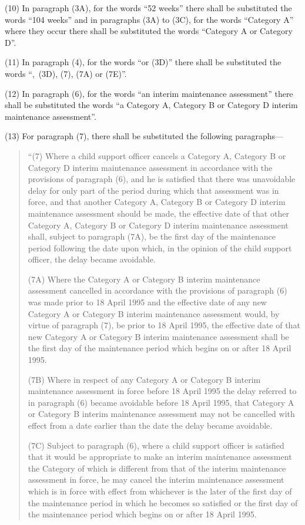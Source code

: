 \documentclass[a4paper]{article}
\begin{document}
(10) In paragraph (3A), for the words “52 weeks” there shall be substituted the words “104 weeks” and in paragraphs (3A) to (3C), for the words “Category A” where they occur there shall be substituted the words “Category A or Category D”.

(11) In paragraph (4), for the words “or (3D)” there shall be substituted the words “,~(3D), (7), (7A) or (7E)”.

(12) In paragraph (6), for the words “an interim maintenance assessment” there shall be substituted the words “a Category A, Category B or Category D interim maintenance assessment”.

(13) For paragraph (7), there shall be substituted the following paragraphs—
\begin{quotation}
“(7) Where a child support officer cancels a Category A, Category B or Category D interim maintenance assessment in accordance with the provisions of paragraph (6), and he is satisfied that there was unavoidable delay for only part of the period during which that assessment was in force, and that another Category A, Category B or Category D interim maintenance assessment should be made, the effective date of that other Category A, Category B or Category D interim maintenance assessment shall, subject to paragraph (7A), be the first day of the maintenance period following the date upon which, in the opinion of the child support officer, the delay became avoidable.

(7A) Where the Category A or Category B interim maintenance assessment cancelled in accordance with the provisions of paragraph (6) was made prior to 18 April 1995 and the effective date of any new Category A or Category B interim maintenance assessment would, by virtue of paragraph (7), be prior to 18 April 1995, the effective date of that new Category A or Category B interim maintenance assessment shall be the first day of the maintenance period which begins on or after 18 April 1995.

(7B) Where in respect of any Category A or Category B interim maintenance assessment in force before 18 April 1995 the delay referred to in paragraph (6) became avoidable before 18 April 1995, that Category A or Category B interim maintenance assessment may not be cancelled with effect from a date earlier than the date the delay became avoidable.

(7C) Subject to paragraph (6), where a child support officer is satisfied that it would be appropriate to make an interim maintenance assessment the Category of which is different from that of the interim maintenance assessment in force, he may cancel the interim maintenance assessment which is in force with effect from whichever is the later of the first day of the maintenance period in which he becomes so satisfied or the first day of the maintenance period which begins on or after 18 April 1995.


\end{quotation}
\end{document}
